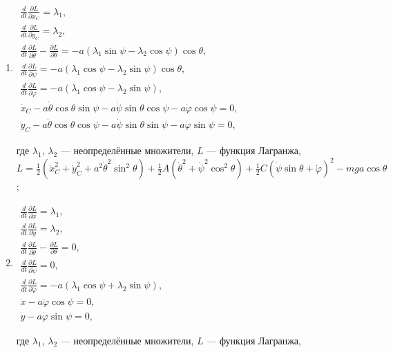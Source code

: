 \begin{enumerate}
\item $\begin{array}{ll}
	\frac{d}{dt}\frac{\partial L}{\partial \dot{x}_C} = \lambda _1,\\
	\frac{d}{dt}\frac{\partial L}{\partial \dot{y}_C} = \lambda _2,\\
	\frac{d}{dt}\frac{\partial L}{\partial\dot{\theta}} -
	\frac{\partial L}{\partial\theta} =
	-a(\lambda _1\sin{\psi} - \lambda _2\cos{\psi})\cos{\theta},\\
	\frac{d}{dt}\frac{\partial L}{\partial\dot{\psi}} =
	-a(\lambda _1\cos{\psi} - \lambda _2\sin{\psi})\cos{\theta},\\
	\frac{d}{dt}\frac{\partial L}{\partial\dot{\varphi}} =
	-a(\lambda _1\cos{\psi} - \lambda _2\sin{\psi}),\\
	\dot{x}_C - a\dot{\theta}\cos{\theta}\sin{\psi} -
	a\dot{\psi}\sin{\theta}\cos{\psi} - a\dot{\varphi}\cos{\psi} = 0,\\
	\dot{y}_C - a\dot{\theta}\cos{\theta}\cos{\psi} -
	a\dot{\psi}\sin{\theta}\sin{\psi} - a\dot{\varphi}\sin{\psi} = 0,
\end{array}$

где $\lambda _1$, $\lambda _2$ --- неопределённые множители,
$L$ --- функция Лагранжа,
$L = \frac{1}{2}
(\dot{x}^2_C + \dot{y}^2_C + a^2\dot{\theta}^2\sin^2{\theta}) +
\frac{1}{2}A(\dot{\theta}^2 + \dot{\psi}^2\cos^2{\theta}) +
\frac{1}{2}C(\dot{\psi}\sin{\theta} + \dot{\varphi})^2 -
mga\cos{\theta}$;
\item $\begin{array}{ll}
	\frac{d}{dt}\frac{\partial L}{\partial\dot{x}} = \lambda _1,\\
	\frac{d}{dt}\frac{\partial L}{\partial\dot{y}} = \lambda _2,\\
	\frac{d}{dt}\frac{\partial L}{\partial\dot{\theta}} -
	\frac{\partial L}{\partial\theta} = 0,\\
	\frac{d}{dt}\frac{\partial L}{\partial\dot{\psi}} = 0,\\
	\frac{d}{dt}\frac{\partial L}{\partial\dot{\varphi}} =
	-a(\lambda _1\cos{\psi} + \lambda _2\sin{\psi}),\\
	\dot{x} -a\dot{\varphi}\cos{\psi} = 0,\\
	\dot{y} -a\dot{\varphi}\sin{\psi} = 0,
\end{array}$

где $\lambda _1$, $\lambda _2$ --- неопределённые множители,
$L$ --- функция Лагранжа,


\end{enumerate}
